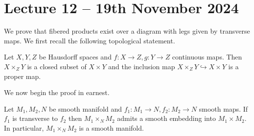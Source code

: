\section{Lecture 12 -- 19th November 2024}\label{sec: lecture 12}
We prove that fibered products exist over a diagram with legs given by transverse maps. We first recall the following topological statement. 
\begin{proposition}\label{prop: fibered product of Hausdorff spaces is closed and proper}
    Let $X,Y,Z$ be Hausdorff spaces and $f:X\to Z,g:Y\to Z$ continuous maps. Then $X\times_{Z}Y$ is a closed subset of $X\times Y$ and the inclusion map $X\times_{Z}Y\hookrightarrow X\times Y$ is a proper map. 
\end{proposition}
We now begin the proof in earnest. 
\begin{theorem}\label{thm: fibered product along transverse legs}
    Let $M_{1},M_{2},N$ be smooth manifold and $f_{1}:M_{1}\to N, f_{2}:M_{2}\to N$ smooth maps. If $f_{1}$ is transverse to $f_{2}$ then $M_{1}\times_{N}M_{2}$ admits a smooth embedding into $M_{1}\times M_{2}$. In particular, $M_{1}\times_{N}M_{2}$ is a smooth manifold. 
\end{theorem}
